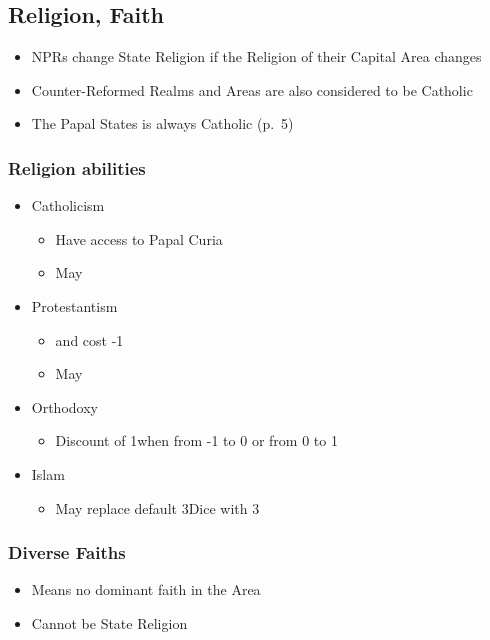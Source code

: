 \documentclass[10pt]{article}
\begin{document}
\subsection*{Religion, Faith }
\begin{itemize}
	\item NPRs change State Religion if the Religion of their Capital Area changes
	\item Counter-Reformed Realms and Areas are also considered to be Catholic
	\item The \guilsinglright Papal States is always Catholic (p.~5)
\end{itemize}

\subsubsection*{Religion abilities}
\begin{itemize}
	\item Catholicism
	\begin{itemize}
		\item Have access to Papal Curia
		\item May 
	\end{itemize}
	\item Protestantism
	\begin{itemize}
		\item {} and  cost -1\adminpower
		\item May 
	\end{itemize}
	\item{Orthodoxy}
	\begin{itemize}
		\item Discount of 1\adminpower when  from -1 to 0 or from 0 to 1
	\end{itemize}
	\item{Islam}
	\begin{itemize}
		\item May replace default 3\infantry Dice with 3\cavalry
	\end{itemize}
\end{itemize}

\subsubsection*{Diverse Faiths}
\begin{itemize}
	\item Means no dominant faith in the Area
	\item Cannot be State Religion
\end{itemize}
\end{document}
